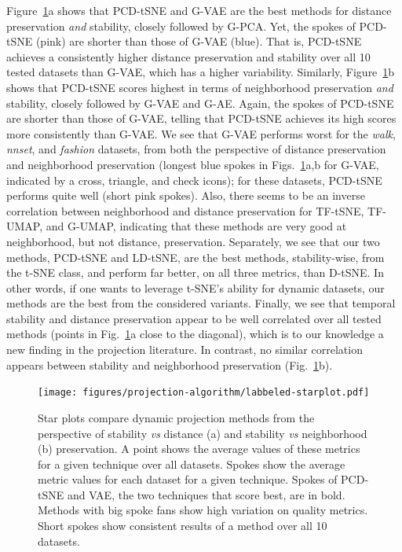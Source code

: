 Figure~\ref{fig:star}a shows that PCD-tSNE and G-VAE are the best methods for distance preservation \emph{and} stability, closely followed by G-PCA. Yet, the spokes of PCD-tSNE (pink) are shorter than those of G-VAE (blue). That is, PCD-tSNE achieves a consistently higher distance preservation and stability over all 10 tested datasets than G-VAE, which has a higher variability. Similarly, Figure~\ref{fig:star}b shows that PCD-tSNE scores highest in terms of neighborhood preservation \emph{and} stability, closely followed by G-VAE and G-AE. Again, the spokes of PCD-tSNE are shorter than those of G-VAE, telling that PCD-tSNE achieves its high scores more consistently than G-VAE. We see that G-VAE performs worst for the \emph{walk}, \emph{nnset}, and \emph{fashion} datasets, from both the perspective of distance preservation and neighborhood preservation (longest blue spokes in Figs.~\ref{fig:star}a,b for G-VAE, indicated by a cross, triangle, and check icons); for these datasets, PCD-tSNE performs quite well (short pink spokes). Also, there seems to be an inverse correlation between neighborhood and distance preservation for TF-tSNE, TF-UMAP, and G-UMAP, indicating that these methods are very good at neighborhood, but not distance, preservation. Separately, we see that our two methods, PCD-tSNE and LD-tSNE, are the best methods, stability-wise, from the t-SNE class, and perform far better, on all three metrics, than D-tSNE. In other words, if one wants to leverage t-SNE's ability for dynamic datasets, our methods are the best from the considered variants. Finally, we see that temporal stability and distance preservation appear to be well correlated over all tested methods (points in Fig.~\ref{fig:star}a close to the diagonal), which is to our knowledge a new finding in the projection literature. In contrast, no similar correlation appears between stability and neighborhood preservation (Fig.~\ref{fig:star}b).


\begin{figure}[htb!]\centering
 \texttt{[image: figures/projection-algorithm/labbeled-starplot.pdf]}
 \vspace{-0.2cm}
 \caption{Star plots compare dynamic projection methods from the perspective of stability \emph{vs} distance (a) and stability \emph{vs} neighborhood (b) preservation. A point shows the average values of these metrics for a given technique over all datasets. Spokes show the average metric values for each dataset for a given technique. Spokes of PCD-tSNE and VAE, the two techniques that score best, are in bold. Methods with big spoke fans show high variation on quality metrics. Short spokes show consistent results of a method over all 10 datasets.}
 \vspace{-0.5cm}
 \label{fig:star}
\end{figure}

